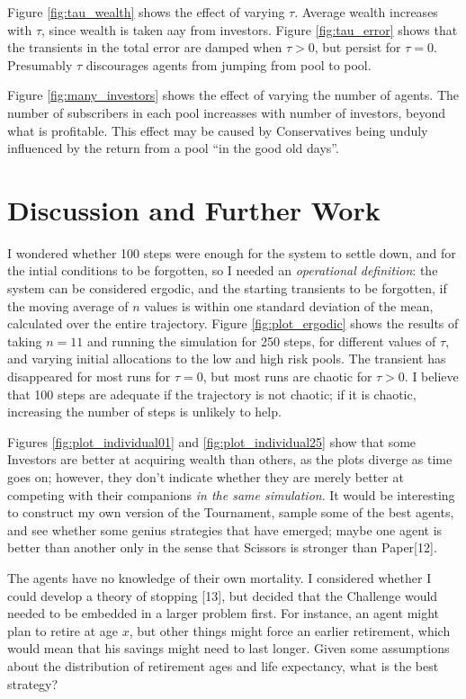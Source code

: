 \documentclass[]{article}
\begin{document}
Figure \ref{fig:tau_wealth} shows the effect of varying \(\tau\).
Average wealth increases with \(\tau\), since wealth is taken aay from
investors. Figure \ref{fig:tau_error} shows that the transients in the
total error are damped when \(\tau>0\), but persist for \(\tau=0\).
Presumably \(\tau\) discourages agents from jumping from pool to pool.

Figure \ref{fig:many_investors} shows the effect of varying the number
of agents. The number of subscribers in each pool increasses with number
of investors, beyond what is profitable. This effect may be caused by
Conservatives being unduly influenced by the return from a pool ``in the
good old days''.

\section{Discussion and Further Work}\label{discussion-and-further-work}

I wondered whether 100 steps were enough for the system to settle down,
and for the intial conditions to be forgotten, so I needed an
\emph{operational definition}: the system can be considered ergodic, and
the starting transients to be forgotten, if the moving average of \(n\)
values is within one standard deviation of the mean, calculated over the
entire trajectory. Figure \ref{fig:plot_ergodic} shows the results of
taking \(n=11\) and running the simulation for 250 steps, for different
values of \(\tau\), and varying initial allocations to the low and high
risk pools. The transient has disappeared for most runs for \(\tau=0\),
but most runs are chaotic for \(\tau>0\). I believe that 100 steps are
adequate if the trajectory is not chaotic; if it is chaotic, increasing
the number of steps is unlikely to help.

Figures \ref{fig:plot_individual01} and \ref{fig:plot_individual25} show
that some Investors are better at acquiring wealth than others, as the
plots diverge as time goes on; however, they don't indicate whether they
are merely better at competing with their companions \emph{in the same
simulation}. It would be interesting to construct my own version of the
Tournament, sample some of the best agents, and see whether some genius
strategies that have emerged; maybe one agent is better than another
only in the sense that Scissors is stronger than Paper{[}12{]}.

The agents have no knowledge of their own mortality. I considered
whether I could develop a theory of stopping {[}13{]}, but decided that
the Challenge would needed to be embedded in a larger problem first. For
instance, an agent might plan to retire at age \(x\), but other things
might force an earlier retirement, which would mean that his savings
might need to last longer. Given some assumptions about the distribution
of retirement ages and life expectancy, what is the best strategy?
\end{document}
